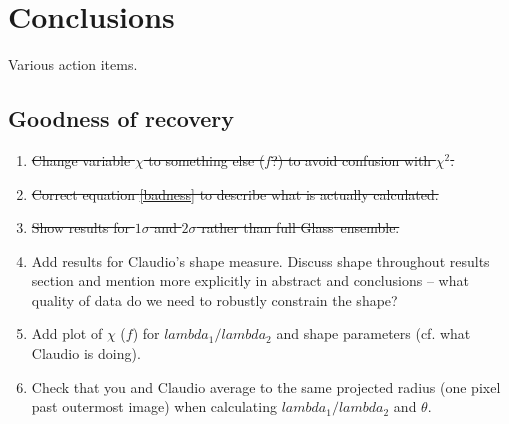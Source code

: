 \documentclass[galley,usenatbib]{mn2e}
\newcommand{\Glass}{{\sc Glass}}
\newcommand{\figref}[1] {Figure~\ref{#1}}
\begin{document}


\section{Conclusions}\label{sec:conclusions}

Various action items.

\subsection{Goodness of recovery}

\begin{enumerate}

  \item \sout{Change variable $\chi$ to something else ($f$?) to avoid confusion with $\chi^2$.}

  \item \sout{Correct equation \eqref{badness} to describe what is actually calculated.}

  \item \sout{Show results for $1\sigma$ and $2\sigma$ rather than full \Glass\ ensemble.}

\item Add results for Claudio's shape measure. Discuss shape
  throughout results section and mention more explicitly in abstract
  and conclusions -- what quality of data do we need to robustly
  constrain the shape?

\item Add plot of $\chi$ ($f$) for $lambda_1/lambda_2$ and shape
  parameters (cf. what Claudio is doing).

\item Check that you and Claudio average to the same projected radius
  (one pixel past outermost image) when calculating
  $lambda_1/lambda_2$ and $\theta$.

\end{enumerate}
\end{document}
